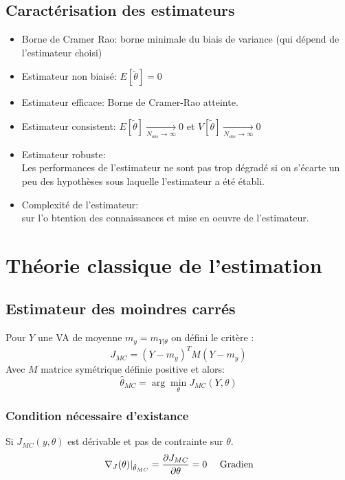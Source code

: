 \documentclass[main.tex]{subfiles}
\begin{document}
\subsection{Caractérisation des estimateurs}
\begin{defin}
  \begin{itemize}
  \item Borne de Cramer Rao:
    borne minimale du biais de variance (qui dépend de l'estimateur choisi)
  \item Estimateur non biaisé: $E[\tilde{\theta}] = 0$
  \item Estimateur efficace: Borne de Cramer-Rao atteinte.
  \item Estimateur consistent: $E[\tilde{\theta}]\xrightarrow[N_{obs}\to\infty]{}0$ et $V[\tilde{\theta}]\xrightarrow[N_{obs}\to\infty]{}0$
  \item Estimateur robuste:\\ Les performances de l'estimateur ne sont pas trop dégradé si on s'écarte un peu des hypothèses sous laquelle l'estimateur a été établi.
  \item Complexité de l'estimateur:\\
    sur l'o btention des connaissances et mise en oeuvre de l'estimateur.
  \end{itemize}
\end{defin}
\section{Théorie classique de l'estimation}
\subsection{Estimateur des moindres carrés}
\begin{defin}
  Pour $Y$ une VA de moyenne $m_y =m_{Y|\theta}$ on défini le critère :
  \[
    J_{MC} = (Y-m_y)^TM(Y-m_y)
  \]
  Avec $M$ matrice symétrique définie positive
  et alors:
   \[
\hat{\theta}_{MC} = \arg\min_{\theta} J_{MC}(Y,\theta)
   \]
\end{defin}

\subsubsection{Condition nécessaire d'existance}

Si  $J_{MC}(y,\theta)$ est dérivable et pas de contrainte sur $\theta$.
\[
  \left.\nabla_J(\theta)\right|_{\hat{\theta}_{MC}} = \derivp[J_{MC}]{\theta} = 0 \quad \text{ Gradien}
\]
\end{document}
